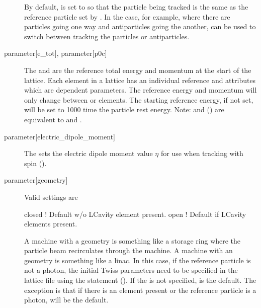 \begin{description}
By default,  is set to  so that the particle being
tracked is the same as the reference particle set by . In the case, for example,
where there are particles going one way and antiparticles going the another,
 can be used to switch between tracking the particles or antiparticles.
%
  \item[{parameter[e_tot], parameter[p0c]}] \Newline
The  and  are the reference total energy and momentum at the
start of the lattice. Each element in a lattice has an individual reference  and 
attributes which are dependent parameters. The reference energy and momentum will only change
between  or  elements. The starting reference energy, if not set, will be set
to 1000 time the particle rest energy.  Note:  and 
() are equivalent to  and .
%
  \item[{parameter[electric_dipole_moment]}] \Newline
The  sets the electric dipole moment value $\eta$ for use when tracking
with spin ().
%
  \item[{parameter[geometry]}] \Newline
Valid  settings are
\begin{example}
  closed  ! Default w/o LCavity element present.
  open    ! Default if LCavity elements present.
\end{example}
A machine with a  geometry is something like a storage ring where the particle beam
recirculates through the machine.  A machine with an  geometry is something like a linac.
In this case, if the reference particle is not a photon, the initial Twiss parameters need to be
specified in the lattice file using the  statement (). If the
 is not specified,  is the default. The exception is that if there is an
 element present or the reference particle is a photon,  will be the default.


\end{description}
